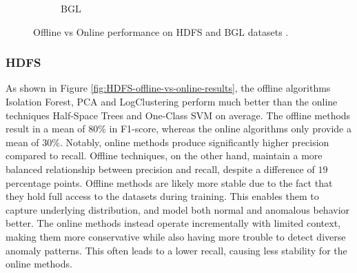 \begin{figure}[t]
{\begin{subfigure}[t]{0.49\textwidth}
        \centering
        \caption{ BGL}
        \label{fig:BGL-offline-vs-online-results}
    \end{subfigure}
    \caption[Offline vs Online performance on HDFS and BGL datasets]{Offline vs Online performance on HDFS and BGL datasets .}
    \label{fig:offline-vs-online-combined}
    }
\end{figure}

\subsubsection{HDFS}
As shown in Figure \ref{fig:HDFS-offline-vs-online-results}, the offline algorithms Isolation Forest, PCA and LogClustering perform much better than the online techniques Half-Space Trees and One-Class SVM on average. The offline methods result in a mean of $80$\% in F1-score, whereas the online algorithms only provide a mean of $30$\%. Notably, online methods produce significantly higher precision compared to recall. Offline techniques, on the other hand, maintain a more balanced relationship between precision and recall, despite a difference of $19$ percentage points. Offline methods are likely more stable due to the fact that they hold full access to the datasets during training. This enables them to capture underlying distribution, and model both normal and anomalous behavior better. The online methods instead operate incrementally with limited context, making them more conservative while also having more trouble to detect diverse anomaly patterns. This often leads to a lower recall, causing less stability for the online methods. 


